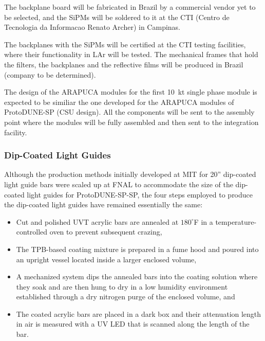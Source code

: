 The backplane board will be fabricated in Brazil by a commercial vendor yet to be selected, and the SiPMs will be soldered to it at the CTI (Centro de Tecnologia da Informacao Renato Archer) in Campinas.  

The backplanes with the SiPMs will be certified at the CTI testing facilities, where their functionality in LAr will be tested.   The mechanical frames that hold the filters, the backplanes and the reflective films will be produced in Brazil (company to be determined).   

The design of the ARAPUCA modules for the first 10~kt single phase module is expected to be similiar the one developed for the ARAPUCA modules of ProtoDUNE-SP (CSU design).   All the components will be sent to the assembly point where the modules will be fully assembled and then sent to the integration facility.



\subsubsection{Dip-Coated Light Guides}
\label{ssec:fdsp-pd-pc-prod-bar1}

Although the production methods initially developed at MIT for 20'' dip-coated light guide bars were scaled up at FNAL to accommodate the size of the dip-coated light guides for ProtoDUNE-SP-SP, the four steps employed to produce the dip-coated light guides have remained essentially the same:

\begin{itemize}
\item Cut and polished UVT acrylic bars are annealed at $180^{\circ}$F in a temperature-controlled oven to prevent subsequent crazing,
\item The TPB-based coating mixture is prepared in a fume hood and poured into an upright vessel located inside a larger enclosed volume,
\item A mechanized system dips the annealed bars into the coating solution where they soak and are then hung to dry in a low humidity environment established through a dry nitrogen purge of the enclosed volume, and
\item The coated acrylic bars are placed in a dark box and their attenuation length in air is measured with a UV LED that is scanned along the length of the bar.
\end{itemize}

